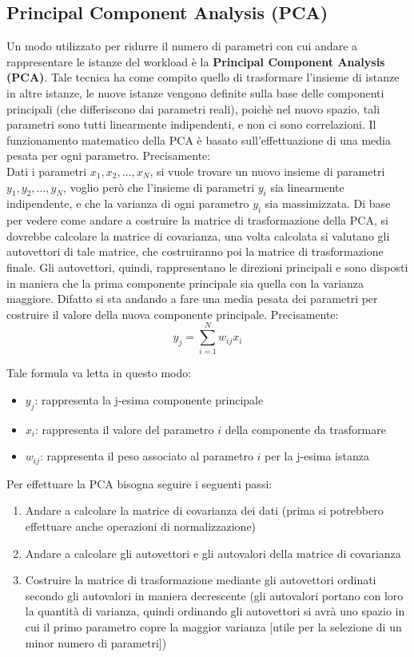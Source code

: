 \clearpage
\subsection{Principal Component Analysis (PCA)}
Un modo utilizzato per ridurre il numero di parametri con cui andare a rappresentare le istanze del workload è la \textbf{Principal Component Analysis (PCA)}. Tale tecnica ha come compito quello di trasformare l'insieme di istanze in altre istanze, le nuove istanze vengono definite sulla base delle componenti principali (che differiscono dai parametri reali), poichè nel nuovo spazio, tali parametri sono tutti linearmente indipendenti, e non ci sono correlazioni. Il funzionamento matematico della PCA è basato sull'effettuazione di una media pesata per ogni parametro. Precisamente:
\\
Dati i parametri \({x_1,x_2,\dots,x_N}\), si vuole trovare un nuovo insieme di parametri \({y_1,y_2,\dots,y_N}\), voglio però che l'insieme di parametri \(y_i\) sia linearmente indipendente, e che la varianza di ogni parametro \(y_i\) sia massimizzata. Di base per vedere come andare a costruire la matrice di trasformazione della PCA, si dovrebbe calcolare la matrice di covarianza, una volta calcolata si valutano gli autovettori di tale matrice, che costruiranno poi la matrice di trasformazione finale. Gli autovettori, quindi, rappresentano le direzioni principali e sono disposti in maniera che la prima componente principale sia quella con la varianza maggiore. Difatto si sta andando a fare una media pesata dei parametri per costruire il valore della nuova componente principale. Precisamente:
\[
y_j = \sum_{i=1}^{N}w_{ij}x_{i}
\]

Tale formula va letta in questo modo:
\begin{itemize}
    \item \textbf{\(y_j\)}: rappresenta la j-esima componente principale
    \item \textbf{\(x_{i}\)}: rappresenta il valore del parametro \(i\) della componente da trasformare
    \item \textbf{\(w_{ij}\)}: rappresenta il peso associato al parametro \(i\) per la j-esima istanza
\end{itemize}

Per effettuare la PCA bisogna seguire i seguenti passi:
\begin{enumerate}
    \item Andare a calcolare la matrice di covarianza dei dati (prima si potrebbero effettuare anche operazioni di normalizzazione)
    \item Andare a calcolare gli autovettori e gli autovalori della matrice di covarianza
    \item Costruire la matrice di trasformazione mediante gli autovettori ordinati secondo gli autovalori in maniera decrescente (gli autovalori portano con loro la quantità di varianza, quindi ordinando gli autovettori si avrà uno spazio in cui il primo parametro copre la maggior varianza [utile per la selezione di un minor numero di parametri])
\end{enumerate}

